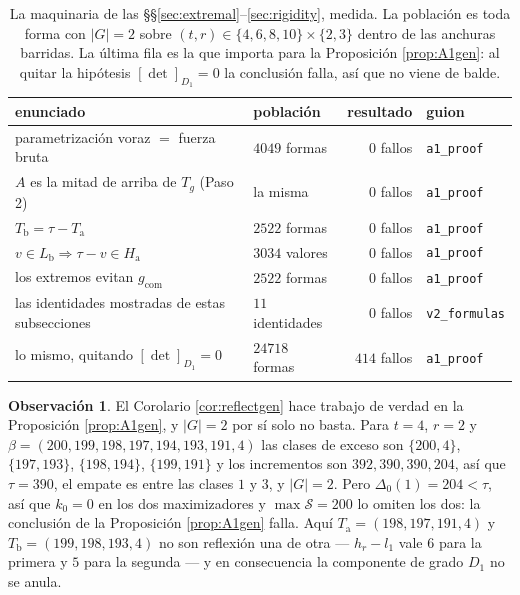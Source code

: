 \documentclass[11pt,reqno]{amsart}
\theoremstyle{plain}
\theoremstyle{definition}
\newtheorem{remark}[theorem]{Observación}
\begin{document}
\begin{table}[!ht]
\centering\small
\caption{La maquinaria de las \S\S\ref{sec:extremal}--\ref{sec:rigidity}, medida. La población es
toda forma con $|G|=2$ sobre $(t,r)\in\{4,6,8,10\}\times\{2,3\}$ dentro de las anchuras barridas. La
última fila es la que importa para la Proposición \ref{prop:A1gen}: al quitar la hipótesis
$[\det]_{D_1}=0$ la conclusión falla, así que no viene de balde.}
\label{tab:extremal}
\begin{tabular}{@{}llrl@{}}
\toprule
enunciado & población & resultado & guion \\
\midrule
\rowcolor{hband} parametrización voraz $=$ fuerza bruta & $4049$ formas & \textcolor{hproved}{$0$ fallos} & \texttt{a1\_proof} \\
$A$ es la mitad de arriba de $T_g$ (Paso 2) & la misma & \textcolor{hproved}{$0$ fallos} & \texttt{a1\_proof} \\
\rowcolor{hband} $T_{\mathrm b}=\tau-T_{\mathrm a}$ & $2522$ formas & \textcolor{hproved}{$0$ fallos} & \texttt{a1\_proof} \\
$v\in L_{\mathrm b}\Rightarrow\tau-v\in H_{\mathrm a}$ & $3034$ valores & \textcolor{hproved}{$0$ fallos} & \texttt{a1\_proof} \\
\rowcolor{hband} los extremos evitan $g_{\mathrm{com}}$ & $2522$ formas & \textcolor{hproved}{$0$ fallos} & \texttt{a1\_proof} \\
las identidades mostradas de estas subsecciones & $11$ identidades & \textcolor{hproved}{$0$ fallos} & \texttt{v2\_formulas} \\
\midrule
\rowcolor{hband} lo mismo, quitando $[\det]_{D_1}=0$ & $24718$ formas & \textcolor{hverif}{$414$ fallos} & \texttt{a1\_proof} \\
\bottomrule
\end{tabular}
\end{table}

\begin{remark}
El Corolario \ref{cor:reflectgen} hace trabajo de verdad en la Proposición \ref{prop:A1gen}, y
$|G|=2$ por sí solo no basta. Para $t=4$, $r=2$ y $\beta=(200,199,198,197,194,193,191,4)$ las clases
de exceso son $\{200,4\}$, $\{197,193\}$, $\{198,194\}$, $\{199,191\}$ y los incrementos son
$392,390,390,204$, así que $\tau=390$, el empate es entre las clases $1$ y $3$, y $|G|=2$. Pero
$\Delta_0(1)=204<\tau$, así que $k_0=0$ en los dos maximizadores y $\max\mathcal{S}=200$ lo omiten los
dos: la conclusión de la Proposición \ref{prop:A1gen} falla. Aquí $T_{\mathrm a}=(198,197,191,4)$ y
$T_{\mathrm b}=(199,198,193,4)$ no son reflexión una de otra --- $h_r-l_1$ vale $6$ para la primera y
$5$ para la segunda --- y en consecuencia la componente de grado $D_1$ no se anula.
\end{remark}
\end{document}
